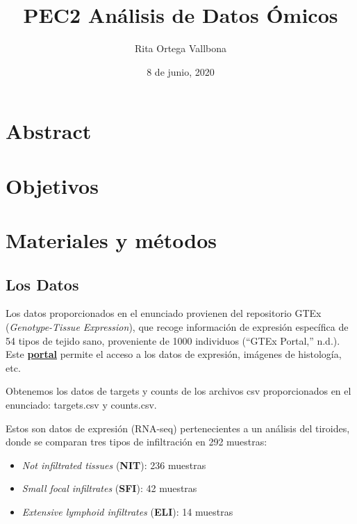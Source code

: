 \documentclass[
  english,
]{article}
\title{PEC2 Análisis de Datos Ómicos}
\author{Rita Ortega Vallbona}
\date{8 de junio, 2020}
\providecommand{\tightlist}{%
  \setlength{\itemsep}{0pt}\setlength{\parskip}{0pt}}
\begin{document}
\maketitle

{
\setcounter{tocdepth}{3}
\tableofcontents
}
\hypertarget{abstract}{%
\section{Abstract}\label{abstract}}

\hypertarget{objetivos}{%
\section{Objetivos}\label{objetivos}}

\hypertarget{materiales-y-muxe9todos}{%
\section{Materiales y métodos}\label{materiales-y-muxe9todos}}

\hypertarget{los-datos}{%
\subsection{Los Datos}\label{los-datos}}

Los datos proporcionados en el enunciado provienen del repositorio GTEx
(\emph{Genotype-Tissue Expression}), que recoge información de expresión
específica de 54 tipos de tejido sano, proveniente de 1000 individuos
(``GTEx Portal,'' n.d.). Este
\href{https://www.gtexportal.org/home/}{\textbf{portal}} permite el
acceso a los datos de expresión, imágenes de histología, etc.

Obtenemos los datos de targets y counts de los archivos csv
proporcionados en el enunciado: targets.csv y counts.csv.

Estos son datos de expresión (RNA-seq) pertenecientes a un análisis del
tiroides, donde se comparan tres tipos de infiltración en 292 muestras:

\begin{itemize}
\tightlist
\item
  \emph{Not infiltrated tissues} (\textbf{NIT}): 236 muestras
\item
  \emph{Small focal infiltrates} (\textbf{SFI}): 42 muestras
\item
  \emph{Extensive lymphoid infiltrates} (\textbf{ELI}): 14 muestras
\end{itemize}
\end{document}
